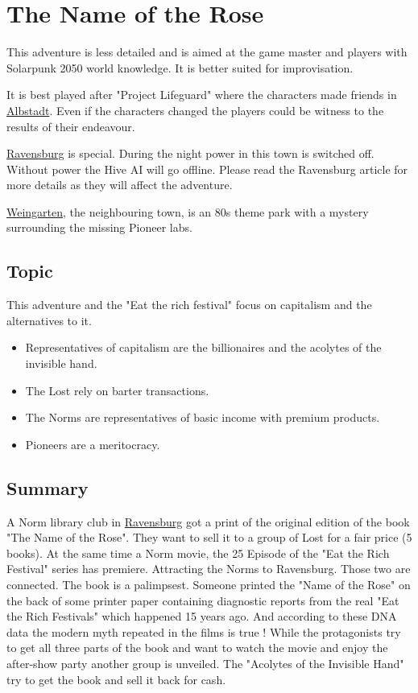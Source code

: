 \chapter{The Name of the Rose}
\label{ch:the name of the rose}

This adventure is less detailed and is aimed at the game master and players with Solarpunk 2050 world knowledge. It is better suited for improvisation.

It is best played after "Project Lifeguard" where the characters made friends in \hyperref[ch:project lifeguard]{Albstadt}. Even if the characters changed the players could be witness to the results of their endeavour.

\hyperref[subsec:Ravensburg]{Ravensburg} is special. During the night power in this town is switched off. Without power the Hive AI will go offline. Please read the Ravensburg article for more details as they will affect the adventure.

\hyperref[subsec:Weingarten]{Weingarten}, the neighbouring town, is an 80s theme park with a mystery surrounding the missing Pioneer labs.

\section{Topic}

This adventure and the "Eat the rich festival" focus on capitalism and the alternatives to it.
\begin{itemize}
    \item Representatives of capitalism are the billionaires and the acolytes of the invisible hand.
    \item The Lost rely on barter transactions.
    \item The Norms are representatives of basic income with premium products.
    \item Pioneers are a meritocracy.
\end{itemize}

\section{Summary}

A Norm library club in \hyperref[subsec:Ravensburg]{Ravensburg} got a print of the original edition of the book "The Name of the Rose". They want to sell it to a group of Lost for a fair price (5 books).
At the same time a Norm movie, the 25 Episode of the "Eat the Rich Festival" series has premiere. Attracting the Norms to Ravensburg. Those two are connected.
The book is a palimpsest. Someone printed the "Name of the Rose" on the back of some printer paper containing diagnostic reports from the real "Eat the Rich Festivals" which happened 15 years ago. And according to these DNA data the modern myth repeated in the films is true !
While the protagonists try to get all three parts of the book and want to watch the movie and enjoy the after-show party another group is unveiled. The "Acolytes of the Invisible Hand" try to get the book and sell it back for cash.


